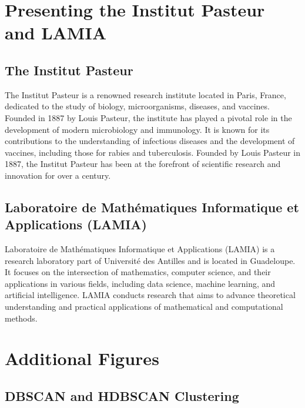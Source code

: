 \begin{appendices}

	\chapter{Presenting the Institut Pasteur and LAMIA}
	\label{app:institut_pasteur_lamia}

	\section{The Institut Pasteur}
	\label{app:institut_pasteur}

	The Institut Pasteur is a renowned research institute located in Paris, France, dedicated to the study of biology,
	microorganisms, diseases, and vaccines. Founded in 1887 by Louis Pasteur, the institute has played a pivotal role
	in the development of modern microbiology and immunology. It is known for its contributions to the understanding of
	infectious diseases and the development of vaccines, including those for rabies and tuberculosis. Founded by
	Louis Pasteur in 1887, the Institut Pasteur has been at the forefront of scientific research and innovation for over
	a century.

	\section{Laboratoire de Mathématiques Informatique et Applications (LAMIA)}
	\label{app:lamia}

	Laboratoire de Mathématiques Informatique et Applications (LAMIA) is a research laboratory part of Université des Antilles
	and is located in Guadeloupe. It focuses on the intersection of mathematics, computer science, and their applications
	in various fields, including data science, machine learning, and artificial intelligence. LAMIA conducts research that
	aims to advance theoretical understanding and practical applications of mathematical and computational methods.

	\chapter{Additional Figures}
	\label{app:additional_figures}

	\section{DBSCAN and HDBSCAN Clustering}
	\label{app:dbscan_hdbscan_clustering}


\end{appendices}
